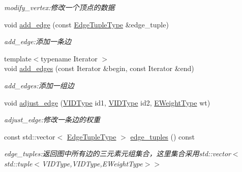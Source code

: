 \begin{DoxyCompactItemize}
\begin{DoxyCompactList}\small\item\em modify\+\_\+vertex\+:修改一个顶点的数据 \end{DoxyCompactList}\item 
void \hyperlink{struct_introduction_to_algorithm_1_1_graph_algorithm_1_1_graph_a3ddca71ba690d09471a7de78bcaa6fea}{add\+\_\+edge} (const \hyperlink{struct_introduction_to_algorithm_1_1_graph_algorithm_1_1_graph_ad1eb485d135eb8076a44b00904ae2f5a}{Edge\+Tuple\+Type} \&edge\+\_\+tuple)
\begin{DoxyCompactList}\small\item\em add\+\_\+edge\+:添加一条边 \end{DoxyCompactList}\item 
{\footnotesize template$<$typename Iterator $>$ }\\void \hyperlink{struct_introduction_to_algorithm_1_1_graph_algorithm_1_1_graph_abda82467495ef0109b14061a6bbe84b9}{add\+\_\+edges} (const Iterator \&begin, const Iterator \&end)
\begin{DoxyCompactList}\small\item\em add\+\_\+edges\+:添加一组边 \end{DoxyCompactList}\item 
void \hyperlink{struct_introduction_to_algorithm_1_1_graph_algorithm_1_1_graph_abfbc7f8a38017fd1422b5c6f1e8b6594}{adjust\+\_\+edge} (\hyperlink{struct_introduction_to_algorithm_1_1_graph_algorithm_1_1_graph_a507632614d13e91d29acbf8acb0b0f0f}{V\+I\+D\+Type} id1, \hyperlink{struct_introduction_to_algorithm_1_1_graph_algorithm_1_1_graph_a507632614d13e91d29acbf8acb0b0f0f}{V\+I\+D\+Type} id2, \hyperlink{struct_introduction_to_algorithm_1_1_graph_algorithm_1_1_graph_a77f6d3ef31203e0d6ebd2ed87928978a}{E\+Weight\+Type} wt)
\begin{DoxyCompactList}\small\item\em adjust\+\_\+edge\+:修改一条边的权重 \end{DoxyCompactList}\item 
const std\+::vector$<$ \hyperlink{struct_introduction_to_algorithm_1_1_graph_algorithm_1_1_graph_ad1eb485d135eb8076a44b00904ae2f5a}{Edge\+Tuple\+Type} $>$ \hyperlink{struct_introduction_to_algorithm_1_1_graph_algorithm_1_1_graph_a0cadf10557297a2cb10aec457eb70b3f}{edge\+\_\+tuples} () const 
\begin{DoxyCompactList}\small\item\em edge\+\_\+tuples\+:返回图中所有边的三元素元组集合，这里集合采用{\ttfamily std\+::vector$<$std\+::tuple$<$V\+I\+D\+Type,V\+I\+D\+Type,E\+Weight\+Type$>$$>$} \end{DoxyCompactList}\item 

\end{DoxyCompactItemize}
